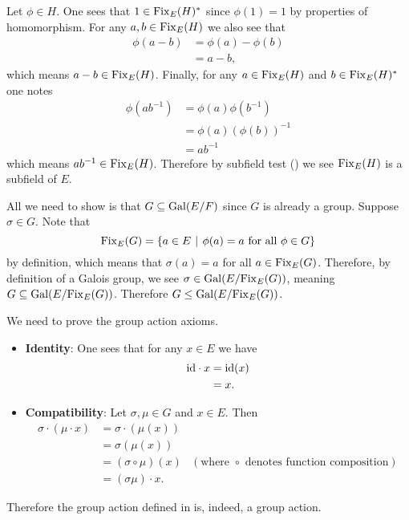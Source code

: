 \begin{questions}
    \item Let $\phi \in H$. One sees that $1 \in \mathrm{Fix}_{E}(H)^\ast$ since $\phi(1) = 1$ by properties of homomorphism. For any $a, b \in \mathrm{Fix}_{E}(H)$ we also see that
    \begin{align*}
        \phi(a - b) &= \phi(a) - \phi(b)\\
        &= a - b,
    \end{align*}
    which means $a - b \in \mathrm{Fix}_{E}(H)$. Finally, for any $a \in \mathrm{Fix}_{E}(H)$ and $b \in \mathrm{Fix}_{E}(H)^\ast$ one notes
    \begin{align*}
        \phi(ab^{-1}) &= \phi(a)\phi(b^{-1})\\
        &= \phi(a)\left(\phi(b)\right)^{-1}\\
        &= ab^{-1}
    \end{align*}
    which means $ab^{-1} \in \mathrm{Fix}_{E}(H)$. Therefore by subfield test () we see $\mathrm{Fix}_{E}(H)$ is a subfield of $E$.

    \item All we need to show is that $G \subseteq \mathrm{Gal}(E/F)$ since $G$ is already a group. Suppose $\sigma \in G$. Note that
    \[
        \Fix{E}{G} = \{a \in E \vert \phi(a) = a \text{ for all } \phi \in G\}
    \]
    by definition, which means that $\sigma(a) = a$ for all $a \in \mathrm{Fix}_{E}(G)$. Therefore, by definition of a Galois group, we see $\sigma \in \mathrm{Gal}(E/\mathrm{Fix}_{E}(G))$, meaning $G \subseteq \mathrm{Gal}(E/\mathrm{Fix}_{E}(G))$. Therefore $G \leq \mathrm{Gal}(E/\mathrm{Fix}_{E}(G))$.

    \item We need to prove the group action axioms.
    \begin{itemize}
        \item \textbf{Identity}: One sees that for any $x \in E$ we have
        \begin{align*}
            \mathrm{id}\cdot x &= \mathrm{id}(x)\\
            &= x.
        \end{align*}
        \item \textbf{Compatibility}: Let $\sigma, \mu \in G$ and $x \in E$. Then
        \begin{align*}
            \sigma \cdot (\mu \cdot x) &= \sigma \cdot (\mu(x))\\
            &= \sigma(\mu(x))\\
            &= (\sigma\circ \mu)(x) & (\text{where } \circ \text{ denotes function composition})\\
            &= (\sigma\mu) \cdot x.
        \end{align*}
    \end{itemize}
    Therefore the group action defined in  is, indeed, a group action.
    

\end{questions}
